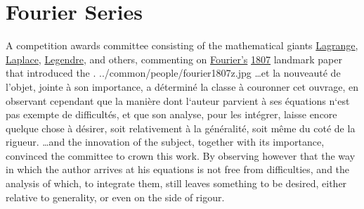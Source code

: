 \chapter{Fourier Series}
\label{chp:fs}
\label{app:fs}
\qboxnpqt
  {
    A competition awards committee consisting of the
    mathematical giants
    \href{http://en.wikipedia.org/wiki/Joseph_Louis_Lagrange}{Lagrange},
    \href{http://en.wikipedia.org/wiki/Laplace}{Laplace},
    \href{http://en.wikipedia.org/wiki/Legendre}{Legendre}, and others,
    commenting on
    \href{http://en.wikipedia.org/wiki/Joseph_Fourier}{Fourier's}
    \href{http://en.wikipedia.org/wiki/1807}{1807} landmark paper
    \href{http://gallica.bnf.fr/ark:/12148/bpt6k33707/f220n7}
          {}
    that introduced the .
    \footnotemark
  }
  {../common/people/fourier1807z.jpg}
  { \ldots et la nouveaut\'e de l'objet, jointe \`a son importance,
    a d\'etermin\'e la classe \`a couronner cet ouvrage,
    en observant cependant que la mani\`ere dont l`auteur parvient
    \`a ses \'equations n`est pas exempte de difficult\'es, et que son analyse,
    pour les int\'egrer, laisse encore quelque chose \`a d\'esirer,
    soit relativement \`a la g\'en\'eralit\'e, soit m\^eme du cot\'e de la rigueur.}
  { \ldots and the innovation of the subject,
    together with its importance,
    convinced the committee to crown this work.
    By observing however that the way in which the author arrives at his equations
    is not free from difficulties, and the analysis of which,
    to integrate them, still leaves something to be desired,
    either relative to generality, or even on the side of rigour.}

